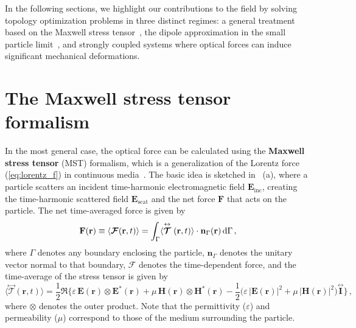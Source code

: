  In the following sections, we highlight our contributions to the field by solving topology optimization problems in three distinct regimes: a general treatment based on the Maxwell stress tensor~\cite{ownpub2}, 
 the dipole approximation in the small particle limit~\cite{ownpub1, ownpub3}, and strongly coupled systems where optical forces can induce significant mechanical deformations.
\section{The Maxwell stress tensor formalism~\cite{ownpub2}}\label{sec:engi}

In the most general case, the optical force can be calculated using the \textbf{Maxwell stress tensor} (MST) formalism, which is a generalization of the Lorentz force (\eqref{eq:lorentz_f}) in continuous media~\cite{novotny}.
The basic idea is sketched in ~(a), where
a particle scatters an incident time-harmonic electromagnetic field $\mathbf{E}_\text{inc}$, creating the time-harmonic scattered field $\mathbf{E}_\text{scat}$ and the net force $\mathbf{F}$ that acts
on the particle. The net time-averaged force is given by~\cite{novotny}
\begin{equation}\label{eq:f_MST}
    \mathbf{F}(\mathbf{r}) \equiv \langle\bm{\mathcal{F}}(\mathbf{r}, t)\rangle=\int_{\Gamma}\langle\stackrel{\leftrightarrow}{\bm{\mathcal{T}}}(\mathbf{r}, t)\rangle \cdot \mathbf{n}_{\Gamma}(\mathbf{r}) \mathop{}\!\text{d} \Gamma\,,
\end{equation}
where $\Gamma$ denotes any boundary enclosing the particle, $\mathbf{n}_{\Gamma}$ denotes the unitary vector normal to that boundary, $\bm{\mathcal{F}}$ denotes the time-dependent force, and
the time-average of the stress tensor is given by
\begin{equation}
        \langle \stackrel{\leftrightarrow}{\bm{\mathcal{T}}}(\mathbf{r}, t) \rangle 
        = \frac{1}{2} \Re \Big\{ 
            \varepsilon\, \mathbf{E}(\mathbf{r}) \otimes \mathbf{E}^*(\mathbf{r})
            + \mu\, \mathbf{H}(\mathbf{r}) \otimes \mathbf{H}^*(\mathbf{r})
         - \frac{1}{2} \big( \varepsilon\, |\mathbf{E}(\mathbf{r})|^2 + \mu\, |\mathbf{H}(\mathbf{r})|^2 \big) 
        \stackrel{\leftrightarrow}{\mathbf{I}} \Big\}\,,
\end{equation}
where $\otimes$ denotes the outer product. Note that the permittivity ($\varepsilon$) and permeability ($\mu$) correspond to those of the medium surrounding the particle.

